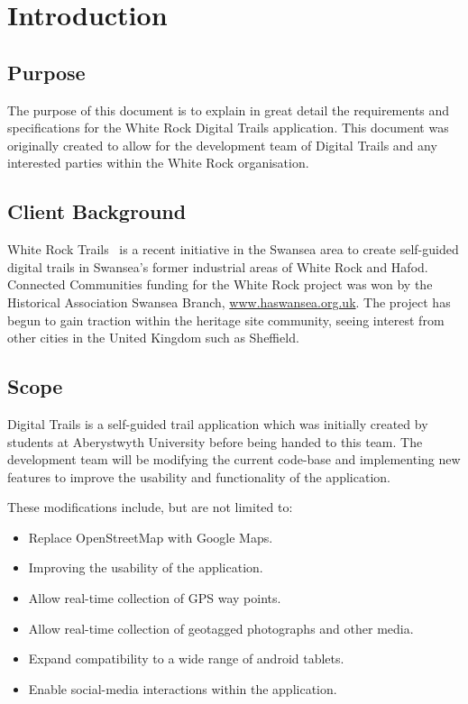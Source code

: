 \documentclass[11pt,a4paper]{article}
\begin{document}


\newpage 

\tableofcontents

\newpage
\section{Introduction}
\subsection{Purpose}
\label{sec:purpose}
The purpose of this document is to explain in great detail the requirements and specifications for the White Rock Digital Trails application. This document was originally created to allow for the development team of Digital Trails and any interested parties within the White Rock organisation.

\subsection{Client Background}
\label{sec:client-background}
White Rock Trails~\cite{whiterock} is a recent initiative in the Swansea area to create self-guided digital trails in Swansea's former industrial areas of White Rock and Hafod. Connected Communities funding for the White Rock project was won by the Historical Association Swansea Branch, \url{www.haswansea.org.uk}. The project has begun to gain traction within the heritage site community, seeing interest from other cities in the United Kingdom such as Sheffield.

\subsection{Scope}
\label{sec:scope}
Digital Trails is a self-guided trail application which was initially created by students at Aberystwyth University before being handed to this team. The development team will be modifying the current code-base and implementing new features to improve the usability and functionality of the application.

These modifications include, but are not limited to:
\begin{itemize}
\item Replace OpenStreetMap with Google Maps.
\item Improving the usability of the application.
\item Allow real-time collection of GPS way points.
\item Allow real-time collection of geotagged photographs and other media.
\item Expand compatibility to a wide range of android tablets.
\item Enable social-media interactions within the application.
\end{itemize}
\end{document}
